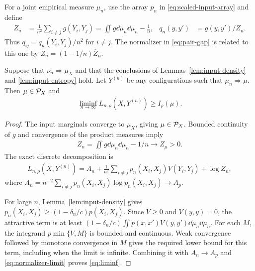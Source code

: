For a joint empirical measure $\mu_n$, use the array $p_n$ in \eqref{eq:scaled-input-array} and define
\begin{align}\label{eq:scaled-output-array}
Z_n&=\frac1{n^2}\sum_{i\ne j}g(Y_i,Y_j)
=\iint g\dd\mu_n\dd\mu_n-\frac1n,
& q_n(y,y')&=g(y,y')/Z_n.
\end{align}
Thus $q_{ij}=q_n(Y_i,Y_j)/n^2$ for $i\ne j$. The normalizer in \eqref{eq:pair-gap} is related to this one by $Z_n=(1-1/n)\overline Z_n$.

\begin{lemma}\label{lem:liminf}
Suppose that $\nu_n\Rightarrow\mu_X$ and that the conclusions of Lemmas~\ref{lem:input-density} and \ref{lem:input-entropy} hold. Let $Y^{(n)}$ be any configurations such that $\mu_n\Rightarrow\mu$. Then $\mu\in\mathcal P_X$ and
\begin{align}\label{eq:liminf}
\liminf_{n\to\infty}L_{n,\rho}(X,Y^{(n)})\geq I_\rho(\mu).
\end{align}
\end{lemma}
\begin{proof}
The input marginals converge to $\mu_X$, giving $\mu\in\mathcal P_X$. Bounded continuity of $g$ and convergence of the product measures imply
\begin{align}\label{eq:normalizer-limit}
Z_n=\iint g\dd\mu_n\dd\mu_n-1/n\longrightarrow Z_\mu>0.
\end{align}
The exact discrete decomposition is
\begin{align}\label{eq:discrete-decomposition}
L_{n,\rho}(X,Y^{(n)})
= A_n+\frac1{n^2}\sum_{i\ne j}p_n(X_i,X_j)V(Y_i,Y_j)+\log Z_n,
\end{align}
where $A_n=n^{-2}\sum_{i\ne j}p_n(X_i,X_j)\log p_n(X_i,X_j)\to A_p$.

For large $n$, Lemma~\ref{lem:input-density} gives
$p_n(X_i,X_j)\geq(1-\delta_n/c)p(X_i,X_j)$. Since $V\geq0$ and $V(y,y)=0$, the attractive term is at least
$(1-\delta_n/c)\iint p(x,x')V(y,y')\dd\mu_n\dd\mu_n$.
For each $M$, the integrand $p\min\{V,M\}$ is bounded and continuous. Weak convergence followed by monotone convergence in $M$ gives the required lower bound for this term, including when the limit is infinite. Combining it with $A_n\to A_p$ and \eqref{eq:normalizer-limit} proves \eqref{eq:liminf}.
\end{proof}
